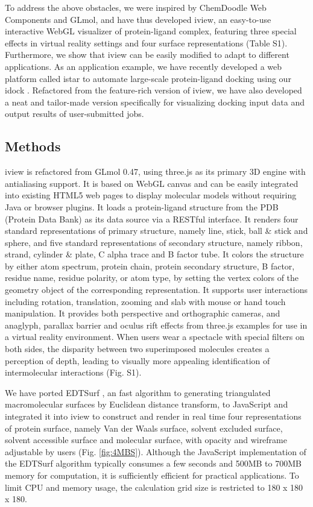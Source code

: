 \documentclass{bioinfo}
\begin{document}
To address the above obstacles, we were inspired by ChemDoodle Web Components and GLmol, and have thus developed iview, an easy-to-use interactive WebGL visualizer of protein-ligand complex, featuring three special effects in virtual reality settings and four surface representations (Table S1). Furthermore, we show that iview can be easily modified to adapt to different applications. As an application example, we have recently developed a web platform called istar to automate large-scale protein-ligand docking using our idock \citep{1153}. Refactored from the feature-rich version of iview, we have also developed a neat and tailor-made version specifically for visualizing docking input data and output results of user-submitted jobs.

\begin{methods}
\section{Methods}

iview is refactored from GLmol 0.47, using three.js as its primary 3D engine with antialiasing support. It is based on WebGL canvas and can be easily integrated into existing HTML5 web pages to display molecular models without requiring Java or browser plugins. It loads a protein-ligand structure from the PDB (Protein Data Bank) \citep{539,537} as its data source via a RESTful interface. It renders four standard representations of primary structure, namely line, stick, ball \& stick and sphere, and five standard representations of secondary structure, namely ribbon, strand, cylinder \& plate, C alpha trace and B factor tube. It colors the structure by either atom spectrum, protein chain, protein secondary structure, B factor, residue name, residue polarity, or atom type, by setting the vertex colors of the geometry object of the corresponding representation. It supports user interactions including rotation, translation, zooming and slab with mouse or hand touch manipulation. It provides both perspective and orthographic cameras, and anaglyph, parallax barrier and oculus rift effects from three.js examples for use in a virtual reality environment. When users wear a spectacle with special filters on both sides, the disparity between two superimposed molecules creates a perception of depth, leading to visually more appealing identification of intermolecular interactions (Fig. S1).

We have ported EDTSurf \citep{1297,1350}, an fast algorithm to generating triangulated macromolecular surfaces by Euclidean distance transform, to JavaScript and integrated it into iview to construct and render in real time four representations of protein surface, namely Van der Waals surface, solvent excluded surface, solvent accessible surface and molecular surface, with opacity and wireframe adjustable by users (Fig. \ref{fig:4MBS}). Although the JavaScript implementation of the EDTSurf algorithm typically consumes a few seconds and 500MB to 700MB memory for computation, it is sufficiently efficient for practical applications. To limit CPU and memory usage, the calculation grid size is restricted to 180 x 180 x 180.


\end{methods}
\end{document}
